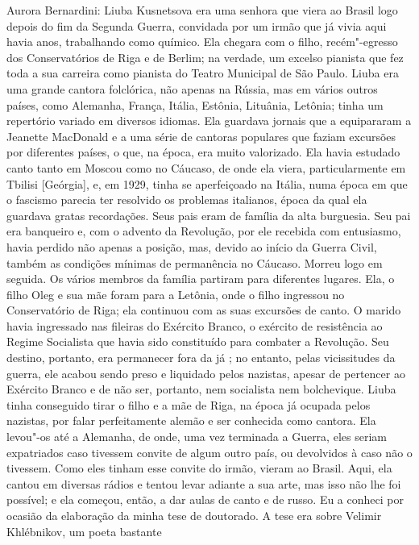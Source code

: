 \noindent
Aurora Bernardini: Liuba Kusnetsova era uma senhora que viera
ao Brasil logo depois do fim da Segunda Guerra, convidada por um irmão
que já vivia aqui havia anos, trabalhando como químico. Ela chegara com
o filho, recém"-egresso dos Conservatórios de Riga e de Berlim; na
verdade, um excelso pianista que fez toda a sua carreira como pianista
do Teatro Municipal de São Paulo. Liuba era uma grande cantora
folclórica, não apenas na Rússia, mas em vários outros países, como
Alemanha, França, Itália, Estônia, Lituânia, Letônia; tinha um
repertório variado em diversos idiomas. Ela guardava jornais que a
equipararam a Jeanette MacDonald e a uma série de cantoras populares que
faziam excursões por diferentes países, o que, na época, era muito
valorizado. Ela havia estudado canto tanto em Moscou como no Cáucaso, de
onde ela viera, particularmente em Tbilisi [Geórgia], e, em 1929,
tinha se aperfeiçoado na Itália, numa época em que o fascismo parecia
ter resolvido os problemas italianos, época da qual ela guardava gratas
recordações. Seus pais eram de família da alta burguesia. Seu pai era
banqueiro e, com o advento da Revolução, por ele recebida com
entusiasmo, havia perdido não apenas a posição, mas, devido ao início da
Guerra Civil, também as condições mínimas de permanência no Cáucaso.
Morreu logo em seguida. Os vários membros da família partiram para
diferentes lugares. Ela, o filho Oleg e sua mãe foram para a Letônia,
onde o filho ingressou no Conservatório de Riga; ela continuou com as
suas excursões de canto. O marido havia ingressado nas fileiras do
Exército Branco, o exército de resistência ao Regime Socialista que
havia sido constituído para combater a Revolução. Seu destino, portanto,
era permanecer fora da já ; no entanto, pelas vicissitudes da
guerra, ele acabou sendo preso e liquidado pelos nazistas, apesar de
pertencer ao Exército Branco e de não ser, portanto, nem socialista nem
bolchevique. Liuba tinha conseguido tirar o filho e a mãe de Riga, na
época já ocupada pelos nazistas, por falar
perfeitamente alemão e ser conhecida como cantora. Ela levou"-os até a
Alemanha, de onde, uma vez terminada a Guerra, eles seriam expatriados
caso tivessem convite de algum outro país, ou devolvidos à  caso não
o tivessem. Como eles tinham esse convite do irmão, vieram ao Brasil.
Aqui, ela cantou em diversas rádios e tentou levar adiante a sua arte,
mas isso não lhe foi possível; e ela começou, então, a dar aulas de
canto e de russo. Eu a conheci por ocasião da elaboração da minha tese
de doutorado. A tese era sobre Velimir Khlébnikov, um poeta bastante
